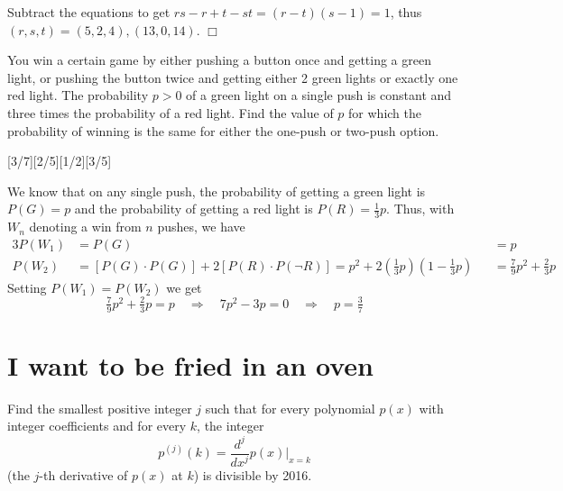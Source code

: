 \begin{solution}[A]
    Subtract the equations to get $rs-r+t-st=(r-t)(s-1)=1$, thus $(r,s,t)=(5,2,4) , (13,0,14)$. $\Box$
\end{solution}

\begin{problem}
    You win a certain game by either pushing a button once and getting a green light, or pushing the button twice and getting either 2 green lights or exactly one red light. The probability $p > 0$ of a green light on a single push is constant and three times the probability of a red light. Find the value of $p$ for which the probability of winning is the same for either the one-push or two-push option.
\end{problem}
[3/7][2/5][1/2][3/5]

\begin{solution}[B]
    We know that on any single push, the probability of getting a green light is $P(G)=p$ and the probability of getting a red light is $P(R)=\frac{1}{3}p$. Thus, with $W_n$ denoting a win from $n$ pushes, we have
    \begin{alignat*}{3}
        P(W_1) &= P(G) &&= p\\
        P(W_2) &= [P(G) \cdot P(G)] + 2[P(R) \cdot P(\neg R)] = p^2 + 2\left(\tfrac{1}{3}p\right)\left(1-\tfrac{1}{3}p\right) &&= \tfrac{7}{9}p^2 + \tfrac{2}{3}p
    \end{alignat*}
    Setting $P(W_1)=P(W_2)$ we get
    \[
        \tfrac{7}{9}p^2 + \tfrac{2}{3}p = p \quad \Rightarrow \quad 7p^2 - 3p = 0 \quad \Rightarrow \quad p = \boxed{\tfrac{3}{7}}
    \]
\end{solution}

\newpage
\section*{I want to be fried in an oven}

\begin{problem}[D][3][Putnam 2016 A1]
    Find the smallest positive integer \( j \) such that for every polynomial \( p(x) \) with integer coefficients and for every \( k \), the integer
\[
p^{(j)}(k) = \frac{d^j}{dx^j}p(x) \bigg|_{x=k}
\]
(the \( j \)-th derivative of \( p(x) \) at \( k \)) is divisible by 2016.
\end{problem}


